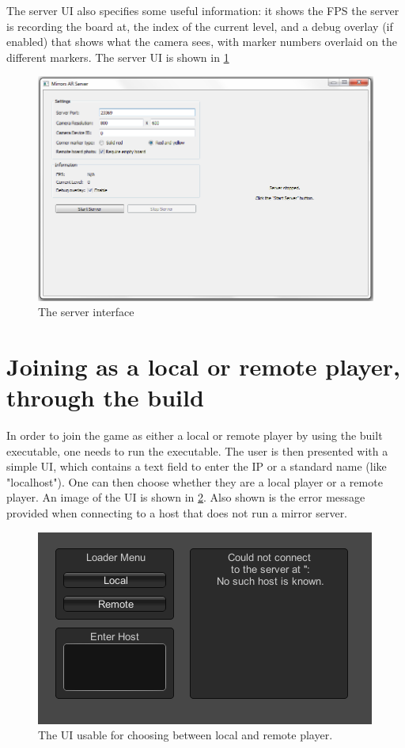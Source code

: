 \documentclass{report}
\begin{document}
	The server UI also specifies some useful information: it shows the FPS the
	server is recording the board at, the index of the current level, and a debug
	overlay (if enabled) that shows what the camera sees, with marker numbers
	overlaid on the different markers. The server UI is shown in \ref{fig:serverui}
	\begin{figure}[!ht]
	    \centering
	    \includegraphics[scale = 0.5]{MirrorServerUI}
	    \caption{The server interface}
	    \label{fig:serverui}
	\end{figure}
	
	\section*{Joining as a local or remote player, through the build}
	In order to join the game as either a local or remote player by using the built
	executable, one needs to run the executable. The user is then presented with a
	simple UI, which contains a text field to enter the IP or a standard name (like
	"localhost"). One can then choose whether they are a local player or a remote
	player. An image of the UI is shown in \ref{fig:remotelocalui}. Also shown is the
	error message provided when connecting to a host that does not run a mirror server.
	\begin{figure}[!ht]
	    \centering
	    \includegraphics[scale = 0.6]{RemoteLocalUI}
	    \caption{The UI usable for choosing between local and remote player.}
	    \label{fig:remotelocalui}
	\end{figure}
	
\end{document}
